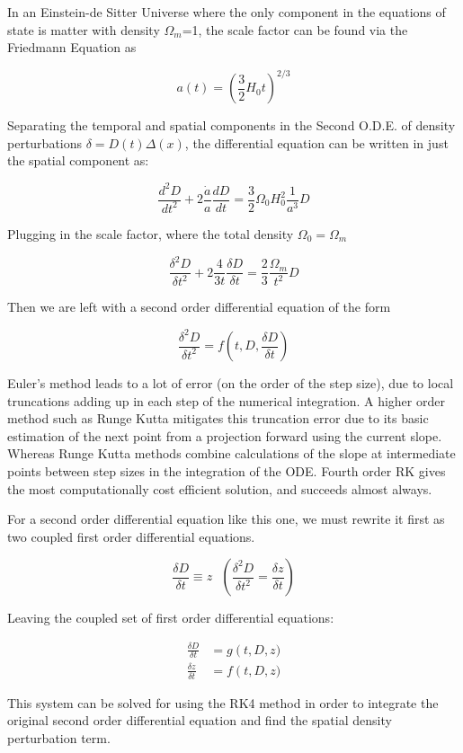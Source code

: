 


In an Einstein-de Sitter Universe where the only component in the equations of state is matter with density $\Omega_m$=1, the scale factor can be found via the Friedmann Equation as

\begin{equation}
  a(t) = \left(\frac{3}{2}H_0t\right)^{2/3}
\end{equation}

Separating the temporal and spatial components in the Second O.D.E. of density perturbations $\delta = D(t)\Delta(x)$, the differential equation can be written in just the spatial component as:

\begin{equation}
  \frac{d^2D}{dt^2}+2\frac{\dot{a}}{a}\frac{dD}{dt}=\frac{3}{2}\Omega_0H_0^2\frac{1}{a^3}D
\end{equation}

Plugging in the scale factor, where the total density $\Omega_0 = \Omega_m$

\begin{equation}
  \frac{\delta^2D}{\delta t^2}+2\frac{4}{3t}\frac{\delta D}{\delta t}=\frac{2}{3}\frac{\Omega_m}{t^2}D
\end{equation}

Then we are left with a second order differential equation of the form

\begin{equation}
  \frac{\delta^2D}{\delta t^2}=f\left(t,D,\frac{\delta D}{\delta t}\right)
\end{equation}

Euler's method leads to a lot of error (on the order of the step size),  due to local truncations adding up in each step of the numerical integration. A higher order method such as Runge Kutta mitigates this truncation error due to its basic estimation of the next point from a projection forward using the current slope. Whereas Runge Kutta methods combine calculations of the slope at intermediate points between step sizes in the integration of the ODE. Fourth order RK gives the most computationally cost efficient solution, and succeeds almost always.

For a second order differential equation like this one, we must rewrite it first as two coupled first order differential equations. 

\begin{equation}
  \frac{\delta D}{\delta t} \equiv z \text{   } \left(\frac{\delta^2D}{\delta t^2} = \frac{\delta z}{\delta t}\right)
\end{equation}

Leaving the coupled set of first order differential equations:

\begin{align}
  \frac{\delta D}{\delta t} &= g\left(t,D,z)\\
  \frac{\delta z}{\delta t} &= f\left(t,D,z)
\end{align}


This system can be solved for using the RK4 method in order to integrate the original second order differential equation and find the spatial density perturbation term.